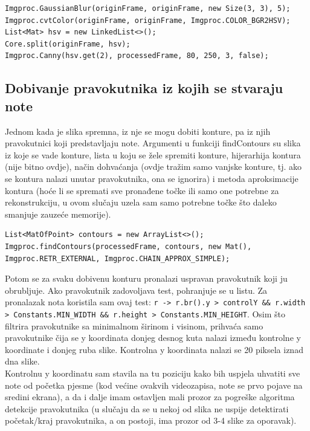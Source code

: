 \documentclass[times, utf8, zavrsni, numeric]{fer}
\begin{document}
\begin{lstlisting}
Imgproc.GaussianBlur(originFrame, originFrame, new Size(3, 3), 5);
Imgproc.cvtColor(originFrame, originFrame, Imgproc.COLOR_BGR2HSV);
List<Mat> hsv = new LinkedList<>();
Core.split(originFrame, hsv);
Imgproc.Canny(hsv.get(2), processedFrame, 80, 250, 3, false);
\end{lstlisting}

\subsection{Dobivanje pravokutnika iz kojih se stvaraju note}
Jednom kada je slika spremna, iz nje se mogu dobiti konture, pa iz njih pravokutnici koji predstavljaju note. Argumenti u funkciji findContours su slika iz koje se vade konture, lista u koju se žele spremiti konture, hijerarhija kontura (nije bitno ovdje), način dohvaćanja (ovdje tražim samo vanjske konture, tj. ako se kontura nalazi unutar pravokutnika, ona se ignorira) i metoda aproksimacije kontura (hoće li se spremati sve pronađene točke ili samo one potrebne za rekonstrukciju, u ovom slučaju uzela sam samo potrebne točke što daleko smanjuje zauzeće memorije).

\begin{lstlisting}
List<MatOfPoint> contours = new ArrayList<>();
Imgproc.findContours(processedFrame, contours, new Mat(), Imgproc.RETR_EXTERNAL, Imgproc.CHAIN_APPROX_SIMPLE);
\end{lstlisting}

Potom se za svaku dobivenu konturu pronalazi uspravan pravokutnik koji ju obrubljuje. Ako pravokutnik zadovoljava test, pohranjuje se u listu. Za pronalazak nota koristila sam ovaj test: \lstinline|r -> r.br().y > controlY && r.width > Constants.MIN_WIDTH && r.height > Constants.MIN_HEIGHT|. Osim što filtrira pravokutnike sa minimalnom širinom i visinom, prihvaća samo pravokutnike čija se y koordinata donjeg desnog kuta nalazi između kontrolne y koordinate i donjeg ruba slike. Kontrolna y koordinata nalazi se 20 piksela iznad dna slike.\\

Kontrolnu y koordinatu sam stavila na tu poziciju kako bih uspjela uhvatiti sve note od početka pjesme (kod većine ovakvih videozapisa, note se prvo pojave na sredini ekrana), a da i dalje imam ostavljen mali prozor za pogreške algoritma detekcije pravokutnika (u slučaju da se u nekoj od slika ne uspije detektirati početak/kraj pravokutnika, a on postoji, ima prozor od 3-4 slike za oporavak).
\end{document}
